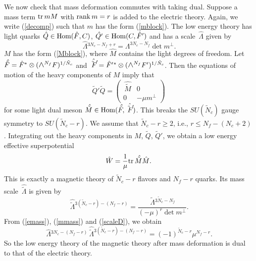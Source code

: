 \documentclass[lecture]{qft-l}
\newcommand{\Lam}{\varLambda}
\newcommand{\medwedge}{\mbox{\fontsize{12pt}{0pt}\selectfont $\wedge$}}
\newcommand{\inv}[1]{\frac{1}{#1}}
\newcommand{\rank}{{\rm rank\,}}
\newcommand{\tr}{{\rm tr}}
\newcommand{\four}[4]{\left(	\begin{array}{cc}
				{#1}	&	{#2}	\\
				{#3}	&	{#4}
				\end{array}   \right)}
\newcommand{\Hom}{{\rm Hom}}
\newcommand{\FT}{F'}%
\newcommand{\QT}{Q'}%
\newcommand{\ND}{\tilde{N}_c}
\newcommand{\FD}{\tilde{F}}
\newcommand{\QD}{\tilde{Q}}
\newcommand{\MD}{\tilde{M}}
\newcommand{\FDT}{\tilde{F}'}
\newcommand{\QDT}{\tilde{Q}'}
\newcommand{\FTh}{\hat{F}'}
\newcommand{\MDh}{\,\hat{\!\MD}}
\newcommand{\FDh}{\,\hat{\!\FD}}
\newcommand{\FDTh}{\hat{\FDT}}
\newcommand{\Lamh}{\,\hat{\!\Lam}{}}
\newcommand{\LamD}{\,\tilde{\!\Lam}{}}
\newcommand{\LamDh}{\,\hat{\tilde{\!\Lam}}{}}
\numberwithin{figure}{chapter}
\begin{document}
We now check that mass deformation commutes with taking dual.
Suppose a mass term $\tr\,mM$ with $\rank m=r$ is added to the electric theory.
Again, we write (\ref{decomp}) such that $m$ has the form (\ref{mblock}).
The low energy theory has light quarks $\hat Q\in\Hom(\hat{F},C)$,
$\hat{\QT}\in\Hom(C,\FTh)$ and has a scale $\Lamh$ given by
	\begin{equation}\label{emass}
\Lamh^{3N_c-N_f+r}=\Lam^{3N_c-N_f}\det m^\perp.
	\end{equation}
$M$ has the form (\ref{Mblock}), where $\hat{M}$ contains the light degrees of 
freedom.
Let $\FDh=\hat{F}^*\otimes(\medwedge^{N_f}F)^{1/\ND}$
and $\FDTh=\FTh{^{*}}\otimes(\medwedge^{N_f}\FT)^{1/\ND}$.
Then the equations of motion of the heavy components of $M$ imply that
	\begin{equation}\label{MD}
\QDT\QD=\four{\MDh}{0}{0}{-\mu m^\perp}
	\end{equation}
for some light dual meson $\MDh\in\Hom(\FDh,\FDTh)$.
This breaks the $SU(\ND)$ gauge symmetry to $SU(\ND-r)$.
We assume that $\ND-r\ge2$, i.e., $r\le N_f-(N_c+2)$.
Integrating out the heavy components in $M$, $\QD$, $\QDT$, we obtain
a low energy effective superpotential
	\begin{equation}\label{Wmass}
\hat{W}=\inv{\mu}\tr\,\MDh\hat{M}.
	\end{equation}
This is exactly a magnetic theory of $\ND-r$ flavors and $N_f-r$ quarks.
Its mass scale $\LamDh$ is given by
	\begin{equation}\label{mmass}
\LamDh^{3(\ND-r)-(N_f-r)}=\frac{\LamD^{3\ND-N_f}}{(-\mu)^r\det m^\perp}.
	\end{equation}
{}From (\ref{emass}), (\ref{mmass}) and (\ref{scaleD}), we obtain
	\begin{equation}
\Lamh^{3N_c-(N_f-r)}\LamDh^{3(\ND-r)-(N_f-r)}=(-1)^{\ND-r}\mu^{N_f-r}.
	\end{equation}
So the low energy theory of the magnetic theory after mass deformation is
dual to that of the electric theory.
\end{document}
